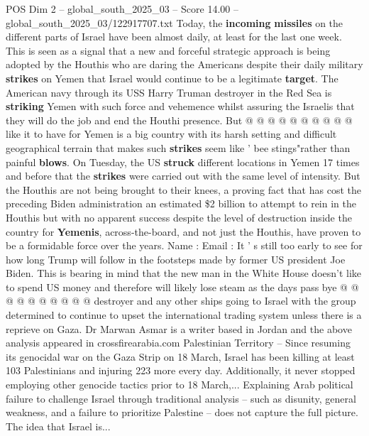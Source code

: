 \begin{textsample}{POS Dim 2 – global\_south\_2025\_03 – Score 14.00 – global\_south\_2025\_03/122917707.txt}
Today, the \textbf{incoming} \textbf{missiles} on the different parts of Israel have been almost daily, at least for the last one week.
This is seen as a signal that a new and forceful strategic approach is being adopted by the Houthis who are daring the Americans despite their daily military \textbf{strikes} on Yemen that Israel would continue to be a legitimate \textbf{target}.
The American navy through its USS Harry Truman destroyer in the Red Sea is \textbf{striking} Yemen with such force and vehemence whilst assuring the Israelis that they will do the job and end the Houthi presence.
But @ @ @ @ @ @ @ @ @ @ like it to have for Yemen is a big country with its harsh setting and difficult geographical terrain that makes such \textbf{strikes} seem like ' bee stings"rather than painful \textbf{blows}.
On Tuesday, the US \textbf{struck} different locations in Yemen 17 times and before that the \textbf{strikes} were carried out with the same level of intensity.
But the Houthis are not being brought to their knees, a proving fact that has cost the preceding Biden administration an estimated \$2 billion to attempt to rein in the Houthis but with no apparent success despite the level of destruction inside the country for \textbf{Yemenis}, across-the-board, and not just the Houthis, have proven to be a formidable force over the years.
Name : Email : It ' s still too early to see for how long Trump will follow in the footsteps made by former US president Joe Biden.
This is bearing in mind that the new man in the White House doesn't like to spend US money and therefore will likely lose steam as the days pass bye @ @ @ @ @ @ @ @ @ @ destroyer and any other ships going to Israel with the group determined to continue to upset the international trading system unless there is a reprieve on Gaza.
Dr Marwan Asmar is a writer based in Jordan and the above analysis appeared in crossfirearabia.com Palestinian Territory -- Since resuming its genocidal war on the Gaza Strip on 18 March, Israel has been killing at least 103 Palestinians and injuring 223 more every day.
Additionally, it never stopped employing other genocide tactics prior to 18 March,...
Explaining Arab political failure to challenge Israel through traditional analysis -- such as disunity, general weakness, and a failure to prioritize Palestine -- does not capture the full picture.
The idea that Israel is...

\end{textsample}
